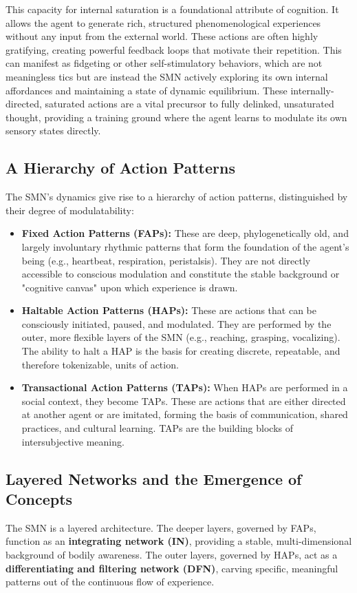 This capacity for internal saturation is a foundational attribute of cognition. It allows the agent to generate rich, structured phenomenological experiences without any input from the external world. These actions are often highly gratifying, creating powerful feedback loops that motivate their repetition. This can manifest as fidgeting or other self-stimulatory behaviors, which are not meaningless tics but are instead the SMN actively exploring its own internal affordances and maintaining a state of dynamic equilibrium. These internally-directed, saturated actions are a vital precursor to fully delinked, unsaturated thought, providing a training ground where the agent learns to modulate its own sensory states directly.

\subsection*{A Hierarchy of Action Patterns}
The SMN's dynamics give rise to a hierarchy of action patterns, distinguished by their degree of modulatability:
\begin{itemize}
    \item \textbf{Fixed Action Patterns (FAPs):} These are deep, phylogenetically old, and largely involuntary rhythmic patterns that form the foundation of the agent's being (e.g., heartbeat, respiration, peristalsis). They are not directly accessible to conscious modulation and constitute the stable background or "cognitive canvas" upon which experience is drawn.
    \item \textbf{Haltable Action Patterns (HAPs):} These are actions that can be consciously initiated, paused, and modulated. They are performed by the outer, more flexible layers of the SMN (e.g., reaching, grasping, vocalizing). The ability to halt a HAP is the basis for creating discrete, repeatable, and therefore tokenizable, units of action.
    \item \textbf{Transactional Action Patterns (TAPs):} When HAPs are performed in a social context, they become TAPs. These are actions that are either directed at another agent or are imitated, forming the basis of communication, shared practices, and cultural learning. TAPs are the building blocks of intersubjective meaning.
\end{itemize}

\subsection*{Layered Networks and the Emergence of Concepts}
The SMN is a layered architecture. The deeper layers, governed by FAPs, function as an \textbf{integrating network (IN)}, providing a stable, multi-dimensional background of bodily awareness. The outer layers, governed by HAPs, act as a \textbf{differentiating and filtering network (DFN)}, carving specific, meaningful patterns out of the continuous flow of experience.

